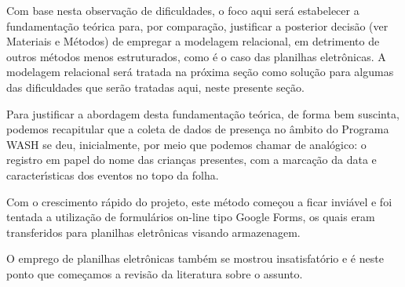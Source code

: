 \documentclass[
12pt,		%
openright,	%
twoside,  %
a4paper,			%
chapter=TITLE,		%
english,			%
french,				%
spanish,			%
brazil				%
]{USPSC-classe/USPSC}
\begin{document}
Com base nesta observa\c{c}\~ao de dificuldades, o foco aqui ser\'a estabelecer a fundamenta\c{c}\~ao te\'orica para, por compara\c{c}\~ao, justificar a posterior decis\~ao (ver Materiais e M\'etodos) de empregar a modelagem relacional, em detrimento de outros m\'etodos menos estruturados, como \'e o caso das planilhas eletr\^onicas. A modelagem relacional ser\'a tratada na pr\'oxima se\c{c}\~ao como solu\c{c}\~ao para algumas das dificuldades que ser\~ao tratadas aqui, neste presente se\c{c}\~ao.

















Para justificar a abordagem desta fundamenta\c{c}\~ao te\'orica, de forma bem suscinta, podemos recapitular que a coleta de dados de presen\c{c}a no \^ambito do Programa WASH se deu, inicialmente, por meio que podemos chamar de anal\'ogico: o registro em papel do nome das crian\c{c}as presentes, com a marca\c{c}\~ao da data e caracter\'{\i}sticas dos eventos no topo da folha.

















Com o crescimento r\'apido do projeto, este m\'etodo come\c{c}ou a ficar invi\'avel e foi tentada a utiliza\c{c}\~ao de formul\'arios on-line tipo \textquotedbl Google Forms\textquotedbl , os quais eram transferidos para planilhas eletr\^onicas visando armazenagem.

















O emprego de planilhas eletr\^onicas tamb\'em se mostrou insatisfat\'orio e \'e neste ponto que come\c{c}amos a revis\~ao da literatura sobre o assunto.
\end{document}
